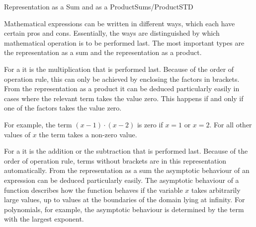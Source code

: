 \begin{MXContent}{Representation as a Sum and as a Product}{Sums/Product}{STD}

% 


Mathematical expressions can be written in different ways, which each have certain pros and cons. Essentially,
the ways are distinguished by which mathematical operation is to be performed last. The most important types
are the representation as a sum and the representation as a product.


\begin{MInfo}
For a  it is the multiplication that is performed last. Because 
of the order of operation rule, this can only be achieved by enclosing the factors in brackets. From the representation as a 
product it can be deduced particularly easily in cases where the relevant term takes the value zero. This happens if and only if
one of the factors takes the value zero.
\end{MInfo}

For example, the term $(x-1)\cdot (x-2)$ is zero if $x=1$ or $x=2$. For all other values of $x$ the term takes a non-zero value.

\begin{MInfo}
For a  it is the addition or the subtraction that is performed last. 
Because of the order of operation rule, terms without brackets are in this representation automatically. From the representation
as a sum the asymptotic behaviour of an expression can be deduced particularly easily. The asymptotic behaviour of a function 
describes how the function behaves if the variable $x$ takes arbitrarily large values, up to values at the boundaries of the domain 
lying at infinity. For polynomials, for example, the asymptotic behaviour is determined by the term with the largest exponent.
\end{MInfo}


\end{MXContent}
